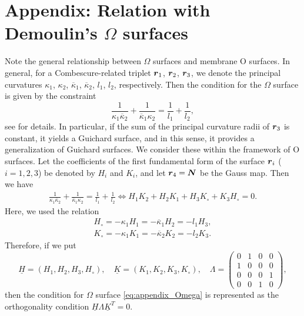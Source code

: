 \documentclass[a4paper]{amsart}
\def\br{\mbox{\boldmath $r$}}
\def\bH{\underline{H}}
\def\bK{\underline{K}}
\def\bN{\mbox{\boldmath $N$}}
\theoremstyle{definition}
\begin{document}
\section{Appendix: Relation with Demoulin's $\Omega$ surfaces}

Note the general relationship between $\Omega$ surfaces and membrane O surfaces.
In general, for a Combescure-related triplet $\br_1$, $\br_2$, $\br_3$, we denote the principal curvatures $\kappa_1$, $\kappa_2$, $\overline{\kappa}_1$, $\overline{\kappa}_2$, $l_1$, $l_2$, respectively.
Then the condition for the $\Omega$ surface is given by the constraint
\begin{equation}
\label{eq:appendix_Omega}
\frac{1}{\kappa_1 \overline{\kappa}_2} + \frac{1}{\overline{\kappa}_1 \kappa_2} 
= \frac{1}{l_1} + \frac{1}{l_2},
\end{equation}
see \cite{Mason} for details.
In particular, if the sum of the principal curvature radii of $\br_3$ is constant, it yields a Guichard surface, and in this sense, it provides a generalization of Guichard surfaces.
We consider these within the framework of O surfaces.
Let the coefficients of the first fundamental form of the surface $\br_i$ ($i=1,2,3$) be denoted by $H_i$ and $K_i$, and let $\br_4 = \bN$ be the Gauss map.
Then we have
\begin{equation}
\label{eq:appendix_orthogonality}
\begin{aligned}
\frac{1}{\kappa_1 \overline{\kappa}_2} + \frac{1}{\overline{\kappa}_1 \kappa_2} = \frac{1}{l_1} + \frac{1}{l_2}
\iff H_1 K_2 + H_2 K_1 + H_3 K_\circ + K_3 H_\circ = 0.
\end{aligned}
\end{equation}
Here, we used the relation
\begin{equation}
\begin{aligned}
H_\circ = - \kappa_1 H_1 = - \overline{\kappa}_1 H_2 = - l_1 H_3,\\
K_\circ = - \kappa_1 K_1 = - \overline{\kappa}_2 K_2 = - l_2 K_3.
\end{aligned}
\end{equation}
Therefore, if we put
\begin{equation}
\bH = (H_1, H_2, H_3, H_\circ), \quad
\bK = (K_1, K_2, K_3, K_\circ), \quad
\Lambda = 
\begin{pmatrix}
0 & 1 & 0 & 0 \\
1 & 0 & 0 & 0 \\
0 & 0 & 0 & 1 \\
0 & 0 & 1 & 0
\end{pmatrix},
\end{equation}
then the condition for $\Omega$ surface \eqref{eq:appendix_Omega} is represented as the orthogonality condition $\bH \Lambda \bK^T = 0$.
\end{document}
